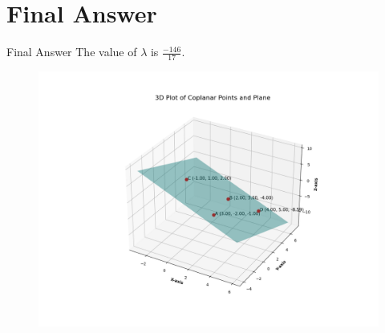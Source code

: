 \documentclass{beamer}
\theoremstyle{remark}
\begin{document}
\section{Final Answer}
\begin{frame}{Final Answer}
The value of $\lambda$ is $\frac{-146}{17}$.

\begin{figure}
    \centering
    \includegraphics[width=0.95\columnwidth]{figs/2.png}
\end{figure}
\end{frame}
\end{document}
